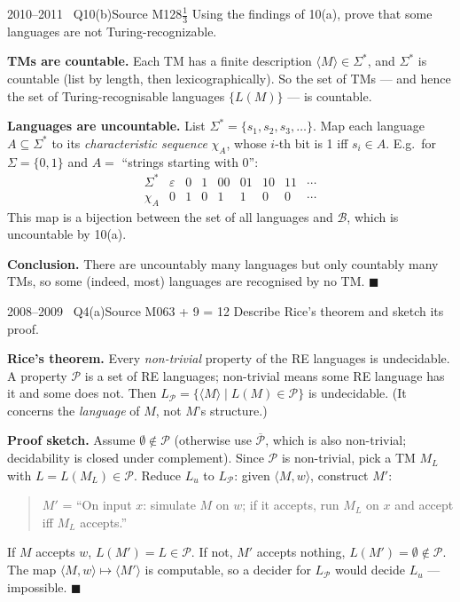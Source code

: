 \documentclass[11pt,a4paper]{article}
\newcommand{\eps}{\varepsilon}
\begin{document}
\begin{question}{2010--2011 \textbullet\ Q10(b)}{Source M12}{8$\tfrac13$}
Using the findings of 10(a), prove that some languages are not Turing-recognizable.
\end{question}
\begin{solution}
\textbf{TMs are countable.} Each TM has a finite description $\langle M\rangle\in\Sigma^*$, and $\Sigma^*$ is countable (list by length, then lexicographically). So the set of TMs --- and hence the set of Turing-recognisable languages $\{L(M)\}$ --- is countable.

\textbf{Languages are uncountable.} List $\Sigma^*=\{s_1,s_2,s_3,\dots\}$. Map each language $A\subseteq\Sigma^*$ to its \emph{characteristic sequence} $\chi_A$, whose $i$-th bit is 1 iff $s_i\in A$. E.g.\ for $\Sigma=\{0,1\}$ and $A=$ ``strings starting with 0'':
\[\begin{array}{lcccccccc}\Sigma^*&\eps&0&1&00&01&10&11&\cdots\\ \chi_A&0&1&0&1&1&0&0&\cdots\end{array}\]
This map is a bijection between the set of all languages and $\mathcal B$, which is uncountable by 10(a).

\textbf{Conclusion.} There are uncountably many languages but only countably many TMs, so some (indeed, most) languages are recognised by no TM. \hfill$\blacksquare$
\end{solution}

\begin{question}{2008--2009 \textbullet\ Q4(a)}{Source M06}{3 + 9 = 12}
Describe Rice's theorem and sketch its proof.
\end{question}
\begin{solution}
\textbf{Rice's theorem.} Every \emph{non-trivial} property of the RE languages is undecidable. A property $\mathcal P$ is a set of RE languages; non-trivial means some RE language has it and some does not. Then $L_{\mathcal P}=\{\langle M\rangle\mid L(M)\in\mathcal P\}$ is undecidable. (It concerns the \emph{language} of $M$, not $M$'s structure.)

\textbf{Proof sketch.} Assume $\emptyset\notin\mathcal P$ (otherwise use $\overline{\mathcal P}$, which is also non-trivial; decidability is closed under complement). Since $\mathcal P$ is non-trivial, pick a TM $M_L$ with $L=L(M_L)\in\mathcal P$. Reduce $L_u$ to $L_{\mathcal P}$: given $\langle M,w\rangle$, construct $M'$:
\begin{quote}
$M'$ = ``On input $x$: simulate $M$ on $w$; if it accepts, run $M_L$ on $x$ and accept iff $M_L$ accepts.''
\end{quote}
If $M$ accepts $w$, $L(M')=L\in\mathcal P$. If not, $M'$ accepts nothing, $L(M')=\emptyset\notin\mathcal P$. The map $\langle M,w\rangle\mapsto\langle M'\rangle$ is computable, so a decider for $L_{\mathcal P}$ would decide $L_u$ --- impossible. \hfill$\blacksquare$
\end{solution}
\end{document}
